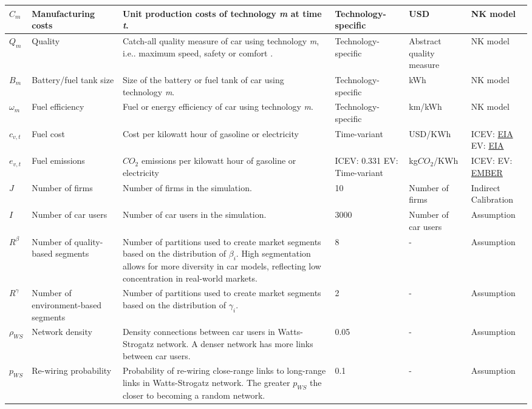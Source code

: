 \documentclass[12pt]{article}
\begin{document}
\begin{longtable}{p{}p{}p{}p{}p{}p{}}
		\hline
		$C_{m}$ & Manufacturing costs & Unit production costs of technology \textit{m} at time \textit{t}. & Technology-specific  & USD & NK model \\
		\hline
		$Q_{m}$ & Quality & Catch-all quality measure of car using technology \textit{m}, i.e.. maximum speed, safety or comfort \citep{neves_technological_2019, singh_review_2020}.  & Technology-specific & Abstract quality measure & NK model \\
		\hline
		$B_{m}$ & Battery/fuel tank size & Size of the battery or fuel tank of car using technology \textit{m}. & Technology-specific & kWh & NK model \\
		\hline
		$\omega_{m}$ & Fuel efficiency & Fuel or energy efficiency of car using technology \textit{m}. & Technology-specific & km/kWh & NK model \\
		\hline
		$c_{v,t}$ & Fuel cost & Cost per kilowatt hour of gasoline or electricity & Time-variant & USD/KWh & ICEV: \href{https://www.eia.gov/petroleum/gasdiesel/}{EIA} EV: \href{https://www.eia.gov/opendata/browser/electricity/retail-sales}{EIA}  \\
		\hline
		$e_{v,t}$ & Fuel emissions & $CO_2$ emissions per kilowatt hour of gasoline or electricity & ICEV: 0.331 EV: Time-variant & kg$CO_2$/KWh & ICEV: \citep[Table 10.8]{ipcc2022transport} EV: \href{https://ember-energy.org/data/us-electricity-data-explorer/}{EMBER}  \\
		\hline
		$J$ & Number of firms & Number of firms in the simulation. & 10 & Number of firms & Indirect Calibration\\
		\hline
		$I$ & Number of car users & Number of car users in the simulation. & 3000 & Number of car users & Assumption \\
		\hline
		$R^\beta$ & Number of quality-based segments & Number of partitions used to create market segments based on the distribution of $\beta_i$. High segmentation allows for more diversity in car models, reflecting low concentration in real-world markets. & 8 & - & Assumption \\
		\hline
		$R^\gamma$ & Number of environment-based segments & Number of partitions used to create market segments based on the distribution of $\gamma_i$. & 2 & - & Assumption \\
		\hline
		$\rho_{WS}$  & Network density & Density connections between car users in Watts-Strogatz network. A denser network has more links between car users. & 0.05 & - & Assumption \\
		\hline
		$p_{WS}$  & Re-wiring probability & Probability of re-wiring close-range links to long-range links in Watts-Strogatz network. The greater $p_{WS}$ the closer to becoming a random network. & 0.1 & - & Assumption \\
		\hline
	\end{longtable}
	
\end{document}
